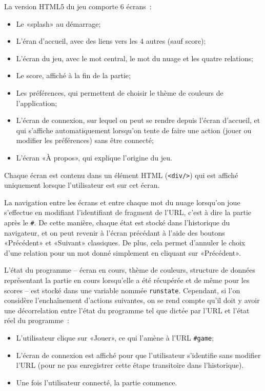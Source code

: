 \documentclass[a4paper,11pt,french]{article}
\begin{document}
La version HTML5 du jeu  comporte 6 écrans~:
\begin{itemize}
\item Le «splash» au démarrage;
\item L'éran d'accueil, avec des liens vers les 4 autres (sauf score);
\item L'écran du jeu, avec le mot central, le mot du nuage et les quatre relations;
\item Le score, affiché à la fin de la partie;
\item Les préférences, qui permettent de choisir le thème de couleurs de l'application;
\item L'écran de connexion, sur lequel on peut se rendre depuis l'écran d'accueil, et qui s'affiche automatiquement lorsqu'on tente de faire
  une action (jouer ou modifier les préférences) sans être connecté;
\item L'écran «À propos», qui explique l'origine du jeu.
\end{itemize}

Chaque écran est contenu dans un élément HTML (\verb!<div/>!) qui est affiché uniquement lorsque l'utilisateur est sur cet écran.

La navigation entre les écrans et entre chaque mot du nuage lorsqu'on joue s'effectue en modifiant l'identifiant de fragment
de l'URL, c'est à dire la partie après le \verb!#!. De cette manière, chaque état est stocké dans l'historique du navigateur, et on peut revenir à
l'écran précédant à l'aide des boutons «Précédent» et «Suivant» classiques. De plus, cela permet d'annuler le choix d'une relation pour
un mot donné simplement en cliquant sur «Précédent».

L'état du programme -- écran en cours, thème de couleurs, structure de données représentant la partie en cours lorsqu'elle a été récupérée et de même pour les scores -- est stocké dans une variable nommée \verb!runstate!. Cependant, si l'on considère l'enchaînement d'actions
suivantes, on se rend compte qu'il doit y avoir une décorrelation entre l'état du programme tel que dictée par l'URL et l'état réel du
programme~:

\begin{itemize}
\item L'utilisateur clique sur «Jouer», ce qui l'amène à l'URL \verb!#game!;
\item L'écran de connexion est affiché pour que l'utilisateur s'identifie sans modifier l'URL (pour ne pas enregistrer cette étape
  transitoire dans l'historique).
\item Une fois l'utilisateur connecté, la partie commence.
\end{itemize}
\end{document}
